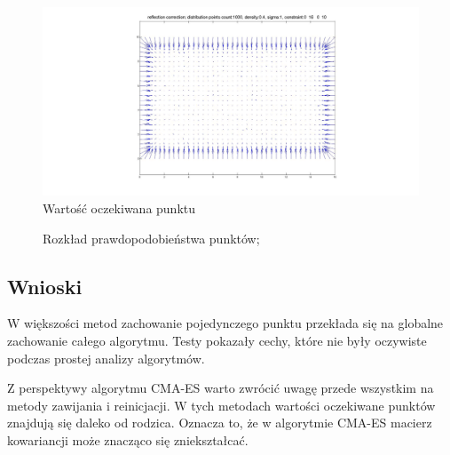 \documentclass{mini}
\begin{document}
\begin{figure}[H]
\centering
\includegraphics[width=\textwidth]{reflection2dprzesuniecie}
\caption{Wartość oczekiwana punktu}
\end{figure}

\begin{figure}[H]
\centering
{}
\quad
{}
\caption{Rozkład prawdopodobieństwa punktów;}
\end{figure}

\subsection{Wnioski}
W większości metod zachowanie pojedynczego punktu przekłada się na globalne zachowanie całego algorytmu. Testy pokazały cechy, które nie były oczywiste podczas prostej analizy algorytmów.

Z perspektywy algorytmu CMA-ES warto zwrócić uwagę przede wszystkim na metody zawijania i reinicjacji. W tych metodach wartości oczekiwane punktów znajdują się daleko od rodzica. Oznacza to, że w algorytmie CMA-ES macierz kowariancji może znacząco się zniekształcać.
\end{document}
